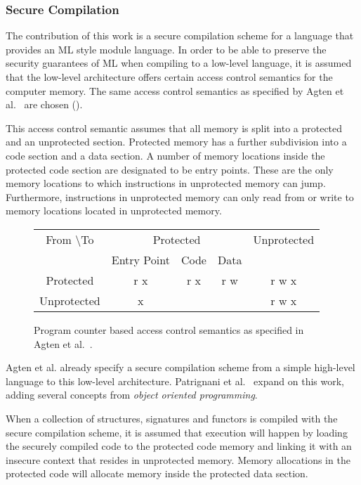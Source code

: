 \documentclass[11pt]{article}
\begin{document}
\subsubsection{Secure Compilation}

The contribution of this work is a secure compilation scheme for a language that provides an ML style module language.
In order to be able to preserve the security guarantees of ML when compiling to a low-level language, it is assumed that the low-level architecture offers certain access control semantics for the computer memory.
The same access control semantics as specified by Agten et al.~\cite{Agten:2012:SCM:2354412.2355247} are chosen ().

This access control semantic assumes that all memory is split into a protected and an unprotected section.
Protected memory has a further subdivision into a code section and a data section.
A number of memory locations inside the protected code section are designated to be entry points.
These are the only memory locations to which instructions in unprotected memory can jump. 
Furthermore, instructions in unprotected memory can only read from or write to memory locations located in unprotected memory.

\begin{figure}[htb]
    \centering
	\begin{tabular}{|c|c|c|c|c|}
		\hline
		From \textbackslash To & \multicolumn{3}{c|}{Protected} & Unprotected \\
		& Entry Point & Code & Data & \\ \hline
		Protected & r x & r x & r w & r w x \\ \hline
		Unprotected & x & & & r w x \\ \hline
	\end{tabular}
    \caption[PCBAC Semantics]{Program counter based access control semantics as specified in Agten et al.~\cite{Agten:2012:SCM:2354412.2355247}. \label{fig:PCBAC}}
\end{figure}

Agten et al. already specify a secure compilation scheme from a simple high-level language to this low-level architecture.
Patrignani et al.~\cite{Patrignani} expand on this work, adding several concepts from \emph{object oriented programming}.

When a collection of structures, signatures and functors is compiled with the secure compilation scheme, it is assumed that execution will happen by loading the securely compiled code to the protected code memory and linking it with an insecure context that resides in unprotected memory. Memory allocations in the protected code will allocate memory inside the protected data section.
\end{document}
